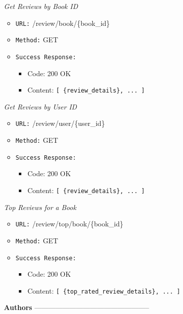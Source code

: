 \begin{itemize}
\item[\textit{Get Reviews by Book ID}]
\begin{itemize}
  \item \texttt{URL:} /review/book/\{book\_id\}  
  \item \texttt{Method:} GET  
  \item \texttt{Success Response:}
  \begin{itemize}
    \item Code: 200 OK  
    \item Content: \texttt{[ \{review\_details\}, ... ]}
  \end{itemize}
\end{itemize}

\item[\textit{Get Reviews by User ID}]
\begin{itemize}
  \item \texttt{URL:} /review/user/\{user\_id\}  
  \item \texttt{Method:} GET  
  \item \texttt{Success Response:}
  \begin{itemize}
    \item Code: 200 OK  
    \item Content: \texttt{[ \{review\_details\}, ... ]}
  \end{itemize}
\end{itemize}

\item[\textit{Top Reviews for a Book}]
\begin{itemize}
  \item \texttt{URL:} /review/top/book/\{book\_id\}  
  \item \texttt{Method:} GET  
  \item \texttt{Success Response:}
  \begin{itemize}
    \item Code: 200 OK  
    \item Content: \texttt{[ \{top\_rated\_review\_details\}, ... ]}
  \end{itemize}
\end{itemize}



\item[\textbf{Authors}] --------------------------------------------------


\end{itemize}
